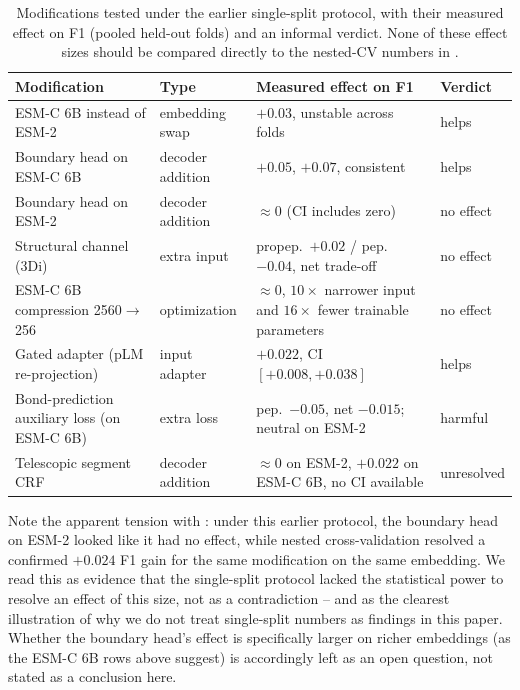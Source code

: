\documentclass{article}
\begin{document}
\begin{table}[h]
\centering
\caption{Modifications tested under the earlier single-split protocol, with their measured effect on F1 (pooled held-out folds) and an informal verdict. None of these effect sizes should be compared directly to the nested-CV numbers in .}
\label{tab:verdict}
\small
\begin{tabular}{p{3.4cm} p{2.1cm} p{4.6cm} p{1.7cm}}
\toprule
\textbf{Modification} & \textbf{Type} & \textbf{Measured effect on F1} & \textbf{Verdict} \\
\midrule
ESM-C 6B instead of ESM-2 & embedding swap & $+0.03$, unstable across folds & helps \\
Boundary head on ESM-C 6B & decoder addition & $+0.05$, $+0.07$, consistent & helps \\
Boundary head on ESM-2 & decoder addition & $\approx 0$ (CI includes zero) & no effect \\
Structural channel (3Di) & extra input & propep.\ $+0.02$ / pep.\ $-0.04$, net trade-off & no effect \\
ESM-C 6B compression 2560$\to$256 & optimization & $\approx 0$, $10\times$ narrower input and $16\times$ fewer trainable parameters & no effect \\
Gated adapter (pLM re-projection) & input adapter & $+0.022$, CI $[+0.008, +0.038]$ & helps \\
Bond-prediction auxiliary loss (on ESM-C 6B) & extra loss & pep.\ $-0.05$, net $-0.015$; neutral on ESM-2 & harmful \\
Telescopic segment CRF & decoder addition & $\approx 0$ on ESM-2, $+0.022$ on ESM-C 6B, no CI available & unresolved \\
\bottomrule
\end{tabular}
\end{table}

Note the apparent tension with : under this earlier protocol, the boundary head on ESM-2 looked like it had no effect, while nested cross-validation resolved a confirmed $+0.024$ F1 gain for the same modification on the same embedding. We read this as evidence that the single-split protocol lacked the statistical power to resolve an effect of this size, not as a contradiction -- and as the clearest illustration of why we do not treat single-split numbers as findings in this paper. Whether the boundary head's effect is specifically larger on richer embeddings (as the ESM-C 6B rows above suggest) is accordingly left as an open question, not stated as a conclusion here.
\end{document}
